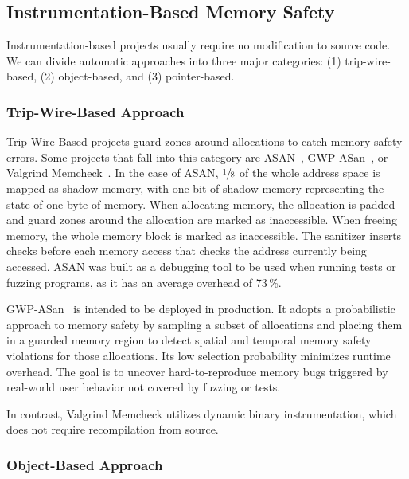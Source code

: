 \subsection{Instrumentation-Based Memory Safety}
\label{subsec:automatic-approaches}

Instrumentation-based projects usually require no modification to source code.
We can divide automatic approaches into three major categories: (1) trip-wire-based, (2) object-based, and (3) pointer-based.

\subsubsection{Trip-Wire-Based Approach}

Trip-Wire-Based projects guard zones around allocations to catch memory safety errors.
Some projects that fall into this category are \ac{ASAN}~\cite{serebryany2012addresssanitizer}, GWP-ASan~\cite{serebryany2023gwp}, or Valgrind Memcheck~\cite{nethercote2007valgrind}.
In the case of \ac{ASAN}, $\sfrac{1}{8}$ of the whole address space is mapped as shadow memory, with one bit of shadow memory representing the state of one byte of memory.
When allocating memory, the allocation is padded and guard zones around the allocation are marked as inaccessible.
When freeing memory, the whole memory block is marked as inaccessible.
The sanitizer inserts checks before each memory access that checks the address currently being accessed.
\Ac{ASAN} was built as a debugging tool to be used when running tests or fuzzing programs, as it has an average overhead of 73\,\%.

GWP-ASan~\cite{serebryany2023gwp} is intended to be deployed in production.
It adopts a probabilistic approach to memory safety by sampling a subset of allocations and placing them in a guarded memory region to detect spatial and temporal memory safety violations for those allocations.
Its low selection probability minimizes runtime overhead.
The goal is to uncover hard-to-reproduce memory bugs triggered by real-world user behavior not covered by fuzzing or tests.

In contrast, Valgrind Memcheck utilizes dynamic binary instrumentation, which does not require recompilation from source.

\subsubsection{Object-Based Approach}


